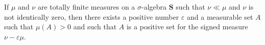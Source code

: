 If $\mu$ and $\nu$ are totally finite measures on a $\sigma$-algebra $\mathbf{S}$ such that $\nu \ll \mu$ and $\nu$ is not identically zero, then there exists a positive number $\varepsilon$ and a measurable set $A$ such that $\mu(A) > 0$ and such that $A$ is a positive set for the signed measure $\nu - \varepsilon \mu$.
